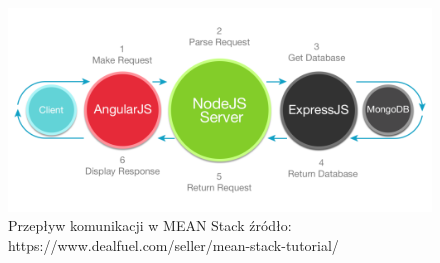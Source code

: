 \documentclass[12pt]{report}
\begin{document}
\begin{figure}[!hb]
\centering
\includegraphics[width=\textwidth,height=\textheight,keepaspectratio]{Meanex.png}
\caption{Przepływ komunikacji w MEAN Stack źródło: https://www.dealfuel.com/seller/mean-stack-tutorial/}
\end{figure}
\end{document}
